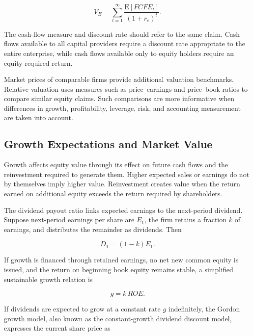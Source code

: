 \begin{equation}
V_E
=
\sum_{t=1}^{\infty}
\frac{\mathrm{E}[FCFE_t]}{(1+r_e)^t}.
\label{eq:ch9-fcfe-valuation}
\end{equation}

The cash-flow measure and discount rate should refer to the same claim. Cash flows available to all capital providers require a discount rate appropriate to the entire enterprise, while cash flows available only to equity holders require an equity required return.

Market prices of comparable firms provide additional valuation benchmarks. Relative valuation uses measures such as price--earnings and price--book ratios to compare similar equity claims. Such comparisons are more informative when differences in growth, profitability, leverage, risk, and accounting measurement are taken into account.

\subsection{Growth Expectations and Market Value}

Growth affects equity value through its effect on future cash flows and the reinvestment required to generate them. Higher expected sales or earnings do not by themselves imply higher value. Reinvestment creates value when the return earned on additional equity exceeds the return required by shareholders.

The dividend payout ratio links expected earnings
to the next-period dividend. Suppose next-period
earnings per share are $E_1$, the firm retains a
fraction $k$ of earnings, and distributes the
remainder as dividends. Then

\begin{equation}
D_1=(1-k)E_1.
\label{eq:ch9-dividend-payout}
\end{equation}

If growth is financed through retained earnings, no
net new common equity is issued, and the return on
beginning book equity remains stable, a simplified
sustainable growth relation is

\begin{equation}
g=k\,ROE.
\label{eq:ch9-sustainable-growth}
\end{equation}

If dividends are expected to grow at a constant rate
$g$ indefinitely, the Gordon growth model, also known
as the constant-growth dividend discount model,
expresses the current share price as

